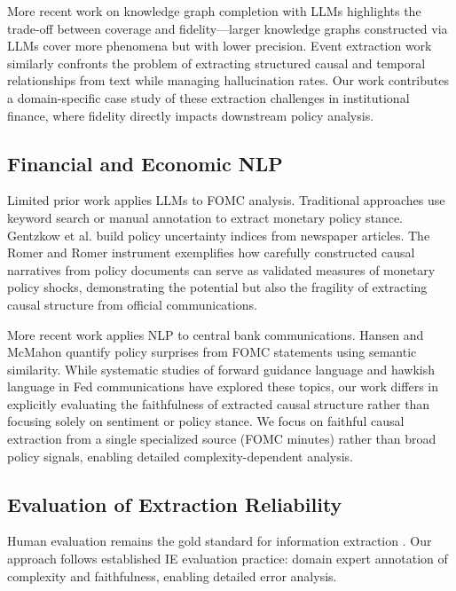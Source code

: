 \documentclass[11pt]{article}
\begin{document}
More recent work on knowledge graph completion with LLMs \cite{zhang2023knowledge, deng2024large} highlights the trade-off between coverage and fidelity—larger knowledge graphs constructed via LLMs cover more phenomena but with lower precision. Event extraction work \cite{newman2022event, miltiadous2024event} similarly confronts the problem of extracting structured causal and temporal relationships from text while managing hallucination rates. Our work contributes a domain-specific case study of these extraction challenges in institutional finance, where fidelity directly impacts downstream policy analysis.

\subsection{Financial and Economic NLP}

Limited prior work applies LLMs to FOMC analysis. Traditional approaches use keyword search or manual annotation \cite{hansen2016policy} to extract monetary policy stance. Gentzkow et al. \cite{gentzkow2019measuring} build policy uncertainty indices from newspaper articles. The Romer and Romer \cite{romer2004monetary} instrument exemplifies how carefully constructed causal narratives from policy documents can serve as validated measures of monetary policy shocks, demonstrating the potential but also the fragility of extracting causal structure from official communications.

More recent work applies NLP to central bank communications. Hansen and McMahon \cite{hansen2016policy} quantify policy surprises from FOMC statements using semantic similarity. While systematic studies of forward guidance language and hawkish language in Fed communications have explored these topics, our work differs in explicitly evaluating the faithfulness of extracted causal structure rather than focusing solely on sentiment or policy stance. We focus on faithful causal extraction from a single specialized source (FOMC minutes) rather than broad policy signals, enabling detailed complexity-dependent analysis.

\subsection{Evaluation of Extraction Reliability}

Human evaluation remains the gold standard for information extraction \cite{ung2022evaluating}. Our approach follows established IE evaluation practice: domain expert annotation of complexity and faithfulness, enabling detailed error analysis.
\end{document}
